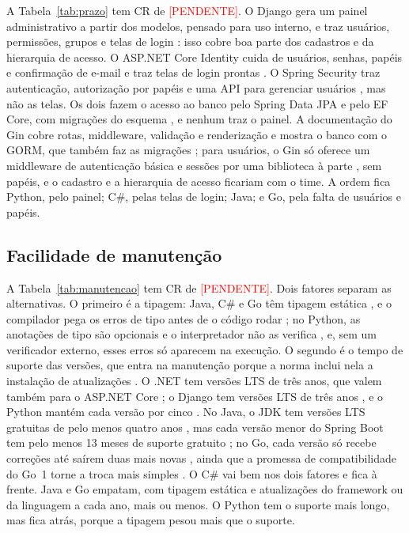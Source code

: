 \documentclass[a4paper]{article}
\newcommand{\pendente}{\textcolor{red}{[PENDENTE]}}
\newcommand{\crPrazo}{\pendente}
\newcommand{\crManutencao}{\pendente}
\newcommand{\tabelagerada}[1]{\IfFileExists{tabelas/#1.tex}{}{\textcolor{red}{[PENDENTE: rodar ahp.py]}}}
\begin{document}
A Tabela~\ref{tab:prazo} tem CR de \crPrazo. O Django gera um painel administrativo a partir dos modelos, pensado para uso interno, e traz usuários, permissões, grupos e telas de login \cite{djangoadmin, djangoauth}: isso cobre boa parte dos cadastros e da hierarquia de acesso. O ASP.NET Core Identity cuida de usuários, senhas, papéis e confirmação de e-mail e traz telas de login prontas \cite{aspnetidentity}. O Spring Security traz autenticação, autorização por papéis e uma API para gerenciar usuários \cite{springsecurity, springauthz, springjdbc}, mas não as telas. Os dois fazem o acesso ao banco pelo Spring Data JPA e pelo EF Core, com migrações do esquema \cite{springdatajpa, springbootdb, efcoremigrations}, e nenhum traz o painel. A documentação do Gin cobre rotas, middleware, validação e renderização \cite{gin} e mostra o banco com o GORM, que também faz as migrações \cite{gindatabase}; para usuários, o Gin só oferece um middleware de autenticação básica \cite{ginbasicauth} e sessões por uma biblioteca à parte \cite{ginsessions}, sem papéis, e o cadastro e a hierarquia de acesso ficariam com o time. A ordem fica Python, pelo painel; C\#, pelas telas de login; Java; e Go, pela falta de usuários e papéis.

\subsection{Facilidade de manutenção}

\begin{table}[H]
    \centering
    \small
    \renewcommand{\arraystretch}{1.25}
    \tabelagerada{matriz_manutencao}
    \caption{Matriz de comparação e vetor de prioridades sob o critério facilidade de manutenção (CR~=~\crManutencao).}
    \label{tab:manutencao}
\end{table}

A Tabela~\ref{tab:manutencao} tem CR de \crManutencao. Dois fatores separam as alternativas. O primeiro é a tipagem: Java, C\# e Go têm tipagem estática \cite{jls, csharptypes, gospec}, e o compilador pega os erros de tipo antes de o código rodar \cite{jls, csharptypes}; no Python, as anotações de tipo são opcionais e o interpretador não as verifica \cite{pythontyping}, e, sem um verificador externo, esses erros só aparecem na execução. O segundo é o tempo de suporte das versões, que entra na manutenção porque a norma inclui nela a instalação de atualizações \cite{arc42iso}. O .NET tem versões LTS de três anos, que valem também para o ASP.NET Core \cite{dotnetsupport}; o Django tem versões LTS de três anos \cite{djangodownload}, e o Python mantém cada versão por cinco \cite{pythonversions}. No Java, o JDK tem versões LTS gratuitas de pelo menos quatro anos \cite{adoptium}, mas cada versão menor do Spring Boot tem pelo menos 13 meses de suporte gratuito \cite{springsupport}; no Go, cada versão só recebe correções até saírem duas mais novas \cite{gorelease}, ainda que a promessa de compatibilidade do Go~1 torne a troca mais simples \cite{go1compat}. O C\# vai bem nos dois fatores e fica à frente. Java e Go empatam, com tipagem estática e atualizações do framework ou da linguagem a cada ano, mais ou menos. O Python tem o suporte mais longo, mas fica atrás, porque a tipagem pesou mais que o suporte.
\end{document}

